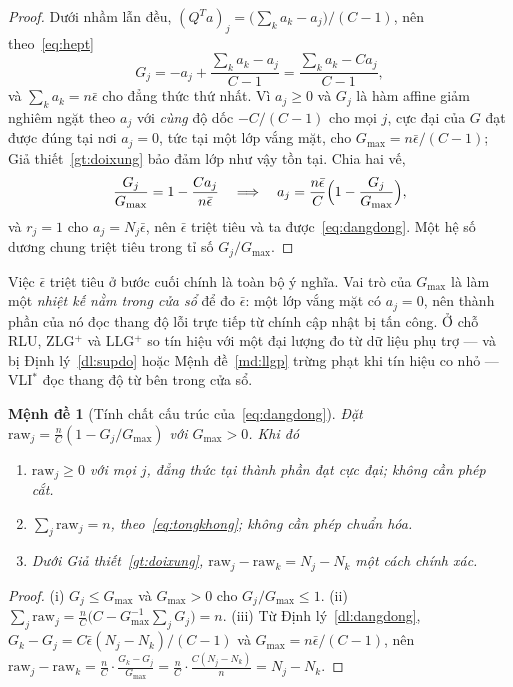 \documentclass[11pt]{article}
\newtheorem{menhde}[dinhly]{Mệnh đề}
\theoremstyle{remark}
\begin{document}
\begin{proof}
Dưới nhầm lẫn đều, $(Q^Ta)_j = \bigl(\sum_k a_k - a_j\bigr)/(C-1)$, nên
theo~\eqref{eq:hept}
\[
 G_j = -a_j + \frac{\sum_k a_k - a_j}{C-1}
     = \frac{\sum_k a_k - C a_j}{C-1} ,
\]
và $\sum_k a_k = n\bar\epsilon$ cho đẳng thức thứ nhất. Vì $a_j \ge 0$ và
$G_j$ là hàm affine giảm nghiêm ngặt theo $a_j$ với \emph{cùng} độ dốc
$-C/(C-1)$ cho mọi $j$, cực đại của $G$ đạt được đúng tại nơi $a_j = 0$, tức
tại một lớp vắng mặt, cho $G_{\max} = n\bar\epsilon/(C-1)$;
Giả thiết~\ref{gt:doixung} bảo đảm lớp như vậy tồn tại. Chia hai vế,
\[
 \frac{G_j}{G_{\max}} = 1 - \frac{C a_j}{n\bar\epsilon}
 \quad\Longrightarrow\quad
 a_j = \frac{n\bar\epsilon}{C}\Bigl(1 - \frac{G_j}{G_{\max}}\Bigr),
\]
và $r_j = 1$ cho $a_j = N_j\bar\epsilon$, nên $\bar\epsilon$ triệt tiêu và ta
được~\eqref{eq:dangdong}. Một hệ số dương chung triệt tiêu trong tỉ số
$G_j/G_{\max}$.
\end{proof}

Việc $\bar\epsilon$ triệt tiêu ở bước cuối chính là toàn bộ ý nghĩa. Vai trò
của $G_{\max}$ là làm một \emph{nhiệt kế nằm trong cửa sổ} để đo
$\bar\epsilon$: một lớp vắng mặt có $a_j = 0$, nên thành phần của nó đọc
thang độ lỗi trực tiếp từ chính cập nhật bị tấn công. Ở chỗ RLU, ZLG$^+$ và
LLG$^+$ so tín hiệu với một đại lượng đo từ dữ liệu phụ trợ --- và bị
Định lý~\ref{dl:supdo} hoặc Mệnh đề~\ref{md:llgp} trừng phạt khi tín hiệu co
nhỏ --- VLI$^*$ đọc thang độ từ bên trong cửa sổ.

\begin{menhde}[Tính chất cấu trúc của~\eqref{eq:dangdong}]
\label{md:tinhchat}
Đặt $\mathrm{raw}_j = \tfrac{n}{C}(1 - G_j/G_{\max})$ với $G_{\max}>0$. Khi
đó
\begin{enumerate}
\item $\mathrm{raw}_j \ge 0$ với mọi $j$, đẳng thức tại thành phần đạt cực
  đại; \emph{không cần} phép cắt.
\item $\sum_j \mathrm{raw}_j = n$, theo~\eqref{eq:tongkhong};
  \emph{không cần} phép chuẩn hóa.
\item Dưới Giả thiết~\ref{gt:doixung},
  $\mathrm{raw}_j - \mathrm{raw}_k = N_j - N_k$ một cách chính xác.
\end{enumerate}
\end{menhde}

\begin{proof}
(i) $G_j \le G_{\max}$ và $G_{\max}>0$ cho $G_j/G_{\max} \le 1$.
(ii) $\sum_j \mathrm{raw}_j = \tfrac{n}{C}\bigl(C - G_{\max}^{-1}\sum_j G_j\bigr) = n$.
(iii) Từ Định lý~\ref{dl:dangdong},
$G_k - G_j = C\bar\epsilon(N_j-N_k)/(C-1)$ và
$G_{\max} = n\bar\epsilon/(C-1)$, nên
$\mathrm{raw}_j - \mathrm{raw}_k = \tfrac{n}{C}\cdot\tfrac{G_k-G_j}{G_{\max}}
 = \tfrac{n}{C}\cdot\tfrac{C(N_j-N_k)}{n} = N_j - N_k$.
\end{proof}
\end{document}
